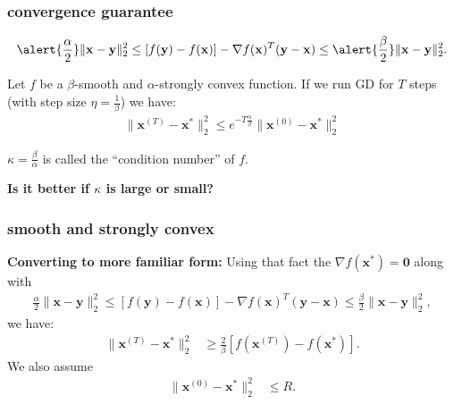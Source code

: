 \documentclass[compress]{beamer}
\newcommand{\bv}[1]{\mathbf{#1}}
\begin{document}
\begin{frame}[t]
	\frametitle{convergence guarantee}
	\begin{align*}
		\alert{\frac{\alpha}{2}}\|\bv{x} - \bv{y}\|_2^2 \leq\left[f(\bv{y}) - f(\bv{x})\right] - \nabla f(\bv{x})^T(\bv{y} - \bv{x}) \leq \alert{\frac{\beta}{2}}\|\bv{x} - \bv{y}\|_2^2.
	\end{align*}
	
	\begin{theorem}
		Let $f$ be a $\beta$-smooth and $\alpha$-strongly convex function. If we run GD for $T$ steps (with step size $\eta = \frac{1}{\beta}$) we have:
		\begin{align*}
			\|\bv{x}^{(T)} - \bv{x}^*\|_2^2 \leq e^{-T \frac{\alpha}{\beta}} \|\bv{x}^{(0)} - \bv{x}^*\|_2^2
		\end{align*} 
	\end{theorem}	
	\begin{center}
		\alert{$\kappa = \frac{\beta}{\alpha}$} is called the ``condition number'' of $f$. 
		
		\textbf{Is it better if $\kappa$ is large or small?}
	\end{center}
\end{frame}

\begin{frame}[t]
	\frametitle{smooth and strongly convex}
	\textbf{Converting to more familiar form:}
	Using that fact the $\nabla f(\bv{x}^*) = \bv{0}$ along with
	\begin{align*}
		{\frac{\alpha}{2}}\|\bv{x} - \bv{y}\|_2^2 \leq  \left[f(\bv{y}) - f(\bv{x})\right] - \nabla f(\bv{x})^T(\bv{y} - \bv{x}) \leq {\frac{\beta}{2}}\|\bv{x} - \bv{y}\|_2^2, 
	\end{align*}
	we have:
	\begin{align*}
		\|\bv{x}^{(T)} - \bv{x}^*\|_2^2 &\geq \frac{2}{\beta} \left[f(\bv{x}^{(T)}) - f(\bv{x}^*)\right].
	\end{align*}	
We also assume
\begin{align*}
			\|\bv{x}^{(0)} - \bv{x}^*\|_2^2 &\leq R.
\end{align*}
\end{frame}
\end{document}
